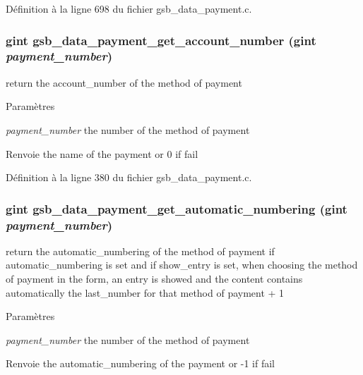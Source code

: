 Définition à la ligne 698 du fichier gsb\_\-data\_\-payment.c.

\subsubsection[{gsb\_\-data\_\-payment\_\-get\_\-account\_\-number}]{\setlength{\rightskip}{0pt plus 5cm}gint gsb\_\-data\_\-payment\_\-get\_\-account\_\-number (gint {\em payment\_\-number})}\label{gsb__data__payment_8h_a02601e83e3a7796d9fc863077dd91627}
return the account\_\-number of the method of payment


\begin{DoxyParams}{Paramètres}
\item[{\em payment\_\-number}]the number of the method of payment\end{DoxyParams}
\begin{DoxyReturn}{Renvoie}
the name of the payment or 0 if fail 
\end{DoxyReturn}


Définition à la ligne 380 du fichier gsb\_\-data\_\-payment.c.

\subsubsection[{gsb\_\-data\_\-payment\_\-get\_\-automatic\_\-numbering}]{\setlength{\rightskip}{0pt plus 5cm}gint gsb\_\-data\_\-payment\_\-get\_\-automatic\_\-numbering (gint {\em payment\_\-number})}\label{gsb__data__payment_8h_adcfc32426d570e071cb397b7a20e5988}
return the automatic\_\-numbering of the method of payment if automatic\_\-numbering is set and if show\_\-entry is set, when choosing the method of payment in the form, an entry is showed and the content contains automatically the last\_\-number for that method of payment + 1


\begin{DoxyParams}{Paramètres}
\item[{\em payment\_\-number}]the number of the method of payment\end{DoxyParams}
\begin{DoxyReturn}{Renvoie}
the automatic\_\-numbering of the payment or -\/1 if fail 
\end{DoxyReturn}


